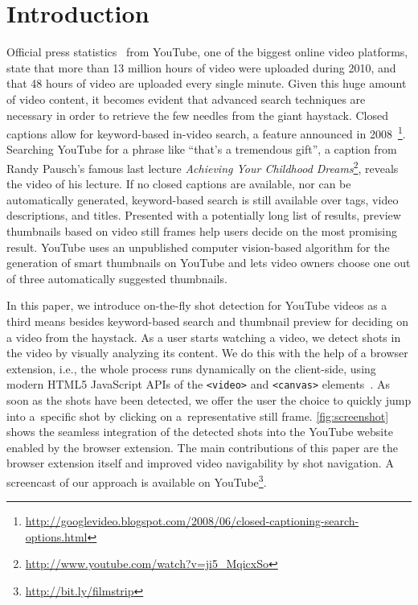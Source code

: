 \documentclass{acm_proc_article-sp}
\newcommand{\inlinelistingsize}{\fontsize{8pt}{11pt}}
\let\oldurl\url
\renewcommand{\url}[1]{\inlinelistingsize\oldurl{#1}}
\begin{document}



\section{Introduction}
Official press statistics~\cite{youtube:stats} from YouTube, one of the biggest online video platforms, state that more than 13 million hours of video were uploaded during 2010, and that 48 hours of video are uploaded every single minute. Given this huge amount of video content, it becomes evident that advanced search techniques are necessary in order to retrieve the few needles from the giant haystack. Closed captions allow for keyword-based in-video search, a feature announced in 2008~\footnote{\url{http://googlevideo.blogspot.com/2008/06/closed-captioning-search-options.html}}. Searching YouTube for a phrase like ``that's a tremendous gift'', a caption from Randy Pausch's famous last lecture \emph{Achieving Your Childhood Dreams}\footnote{\url{http://www.youtube.com/watch?v=ji5\_MqicxSo}}, reveals the video of his lecture. If no closed captions are available, nor can be automatically generated, keyword-based search is still available over tags, video descriptions, and titles. Presented with a potentially long list of results, preview thumbnails based on video still frames help users decide on the most promising result. YouTube uses an unpublished computer vision-based algorithm for the generation of smart thumbnails on YouTube and lets video owners choose one out of three automatically suggested thumbnails.

In this paper, we introduce on-the-fly shot detection for YouTube videos as a third means besides keyword-based search and thumbnail preview for deciding on a video from the haystack. As a user starts watching a video, we detect shots in the video by visually analyzing its content. We do this with the help of a browser extension, i.e., the whole process runs dynamically on the client-side, using modern HTML5 JavaScript APIs of the \texttt{<video>} and \texttt{<canvas>} elements~\cite{w3c_html5}. As soon as the shots have been detected, we offer the user the choice to quickly jump into a~specific shot by clicking on a~representative still frame. \autoref{fig:screenshot} shows the seamless integration of the detected shots into the YouTube website enabled by the browser extension. The main contributions of this paper are the browser extension itself and improved video navigability by shot navigation. A screencast of our approach is available on YouTube\footnote{\url{http://bit.ly/filmstrip}}.
\end{document}
